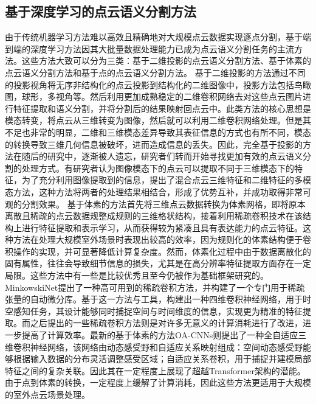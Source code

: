 \subsection{基于深度学习的点云语义分割方法}
由于传统机器学习方法难以高效且精确地对大规模点云数据实现逐点分割，基于端到端的深度学习方法因其大批量数据处理能力已成为点云语义分割任务的主流方法。这些方法大致可以分为三类：基于二维投影的点云语义分割方法、基于体素的点云语义分割方法和基于点的点云语义分割方法。
基于二维投影的方法通过不同的投影视角将无序非结构化的点云投影到结构化的二维图像中，投影方法包括鸟瞰图，球形，多视角等。然后利用更加成熟稳定的二维卷积网络去对这些点云图片进行特征提取和语义分割，并将分割后的结果映射回点云中。此类方法的核心思想是模态转变，将点云从三维转变为图像，然后就可以利用二维卷积网络处理。但是其不足也非常的明显，二维和三维模态差异导致其表征信息的方式也有所不同，模态的转换导致三维几何信息被破坏，进而造成信息的丢失。因此，完全基于投影的方法在随后的研究中，逐渐被人遗忘，研究者们转而开始寻找更加有效的点云语义分割的处理方式。有研究者认为图像模态下的点云可以提取不同于三维模态下的特征，为了充分利用图像提取到的信息，提出了混合点云三维特征和二维特征的多模态方法，这种方法将两者的处理结果相结合，形成了优势互补，并成功取得非常可观的分割效果。
基于体素的方法首先将三维点云数据转换为体素网格，即将原本离散且稀疏的点云数据规整成规则的三维格状结构，接着利用稀疏卷积技术在该结构上进行特征提取和表示学习，从而获得较为紧凑且具有表达能力的点云特征。这种方法在处理大规模室外场景时表现出较高的效率，因为规则化的体素结构便于卷积操作的实现，并可显著降低计算复杂度。然而，体素化过程中由于数据离散化的固有属性，往往会导致细节信息的损失，尤其是在高分辨率特征提取方面存在一定局限。这些方法中有一些是比较优秀且至今仍被作为基础框架研究的。MinkowskiNet提出了一种高可用到的稀疏卷积方法，并构建了一个专门用于稀疏张量的自动微分库。基于这一方法与工具，构建出一种四维卷积神经网络，用于时空感知任务，其设计能够同时捕捉空间与时间维度的信息，实现更为精准的特征提取。而之后提出的一些稀疏卷积方法则是对许多无意义的计算消耗进行了改进，进一步提高了计算效率。最新的基于体素的方法OA-CNNs则提出了一种全自适应三维卷积神经网络，该网络由动态感受野和自适应关系映射组成：空间动态感受野能够根据输入数据的分布灵活调整感受区域；自适应关系卷积，用于捕捉并建模局部特征之间的复杂关联。因此其在一定程度上展现了超越Transformer架构的潜能。由于点到体素的转换，一定程度上缓解了计算消耗，因此这些方法更适用于大规模的室外点云场景处理。
